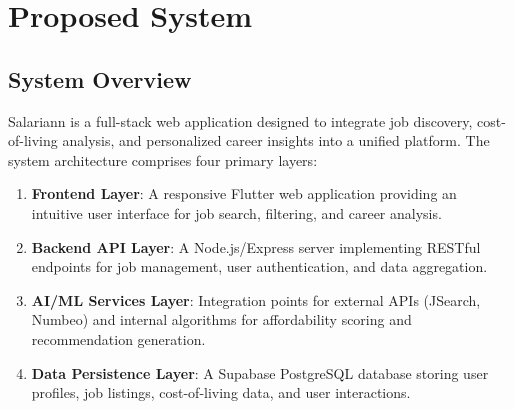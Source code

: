 
\chapter{Proposed System}

\section{System Overview}

Salariann is a full-stack web application designed to integrate job discovery, cost-of-living analysis, and personalized career insights into a unified platform. The system architecture comprises four primary layers:

\begin{enumerate}
    \item \textbf{Frontend Layer}: A responsive Flutter web application providing an intuitive user interface for job search, filtering, and career analysis.
    
    \item \textbf{Backend API Layer}: A Node.js/Express server implementing RESTful endpoints for job management, user authentication, and data aggregation.
    
    \item \textbf{AI/ML Services Layer}: Integration points for external APIs (JSearch, Numbeo) and internal algorithms for affordability scoring and recommendation generation.
    
    \item \textbf{Data Persistence Layer}: A Supabase PostgreSQL database storing user profiles, job listings, cost-of-living data, and user interactions.
\end{enumerate}

